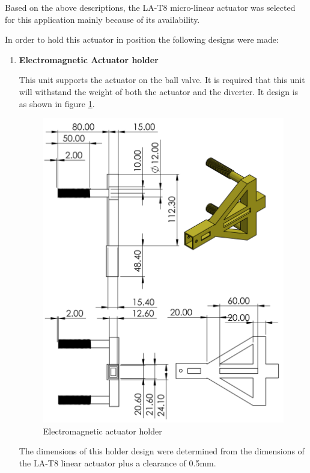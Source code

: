 Based on the above descriptions, the LA-T8 micro-linear actuator was selected for this application mainly because of its availability.
\par
In order to hold this actuator in position the following designs were made:
\begin{enumerate}
    \item \textbf{Electromagnetic Actuator holder}
    \par
    This unit supports the actuator on the ball valve. It is required that this unit will withstand the weight of both the actuator and the diverter. It design is as shown in figure \ref{fig:electromagnetic_actuator}.
    \begin{figure}[H]
        \centering
        \includegraphics[height=.5\textheight]{Figures/LA-T8Holder.PNG}
        \caption{Electromagnetic actuator holder}
        \label{fig:electromagnetic_actuator}
    \end{figure}
    The dimensions of this holder design were determined from the dimensions of the LA-T8 linear actuator plus a clearance of 0.5mm.
    

\end{enumerate}
